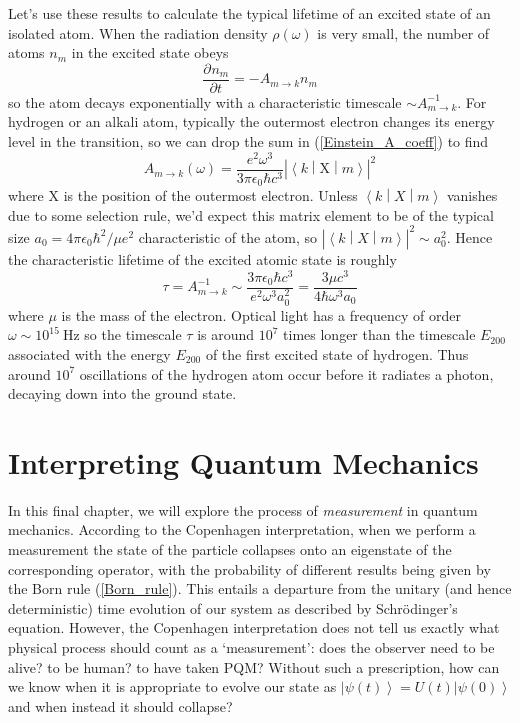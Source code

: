\documentclass{article}
\theoremstyle{plain}\theoremheaderfont{\normalfont\itshape}\theorembodyfont{\rmfamily}\theoremseparator{.}\newtheorem*{rem}{Remark}\newtheorem*{ex}{Example}\newtheorem*{proof}{Proof}\newtheorem*{altp}{Alternative proof}
\theoremstyle{plain}\theoremheaderfont{\normalfont\bfseries}\theorembodyfont{\rmfamily}\theoremseparator{.}\newtheorem{thm}{Theorem}[section]\newtheorem{lem}[thm]{Lemma}\newtheorem{prop}[thm]{Proposition}\newtheorem*{cor}{Corollary}\newtheorem{defn}[thm]{Definition}\newtheorem{clm}[thm]{Claim}\newtheorem{clminproof}{Claim}
\theoremstyle{break}\theoremheaderfont{\normalfont\itshape}\theorembodyfont{\rmfamily}\theoremseparator{.\medskip}\newtheorem*{proofskip}{Proof}\newtheorem*{exs}{Examples}\newtheorem*{rems}{Remarks}
\theoremstyle{break}\theoremheaderfont{\normalfont\bfseries}\theorembodyfont{\rmfamily}\theoremseparator{.\medskip}\newtheorem{lemskip}[thm]{Lemma}\newtheorem{defnskip}[thm]{Definition}\newtheorem{propskip}[thm]{Proposition}\newtheorem{thmskip}[thm]{Theorem}
\numberwithin{equation}{section}
\newcommand{\unit}[1]{\ \mathrm{#1}}
\newcommand{\pdv}[3][]{\frac{\partial^{#1} #2}{{\partial #3}^{#1}}}
\newcommand{\ket}[1]{\left| #1 \right\rangle}
\newcommand{\mel}[3]{\left\langle #1 \middle| #2 \middle| #3 \right\rangle}
\newcommand{\vb}[1]{\bm{\mathrm{#1}}}
\newcommand{\abs}[1]{\left| #1 \right|}
\begin{document}
    Let's use these results to calculate the typical lifetime of an excited state of an isolated atom. When the radiation density \(\rho(\omega)\) is very small, the number of atoms \(n_m\) in the excited state obeys
    \begin{equation}
        \pdv{n_m}{t}=-A_{m\to k}n_m
    \end{equation}
    so the atom decays exponentially with a characteristic timescale \(\sim A_{m\to k}^{-1}\). For hydrogen or an alkali atom, typically the outermost electron changes its energy level in the transition, so we can drop the sum in (\ref{Einstein_A_coeff}) to find
    \begin{equation}
        A_{m\to k}(\omega)=\frac{e^2\omega^3}{3\pi\epsilon_0\hbar c^3}\abs{\mel{k}{\vb{X}}{m}}^2
    \end{equation}
    where \(\vb{X}\) is the position of the outermost electron. Unless \(\mel{k}{X}{m}\) vanishes due to some selection rule, we'd expect this matrix element to be of the typical size \(a_0=4\pi\epsilon_0\hbar^2/\mu e^2\) characteristic of the atom, so \(\abs{\mel{k}{X}{m}}^2\sim a_0^2\). Hence the characteristic lifetime of the
    excited atomic state is roughly
    \begin{equation}
        \tau=A_{m\to k}^{-1}\sim\frac{3\pi\epsilon_0\hbar c^3}{e^2\omega^3 a_0^2}=\frac{3\mu c^3}{4\hbar\omega^3 a_0}
    \end{equation}
    where \(\mu\) is the mass of the electron. Optical light has a frequency of order \(\omega\sim 10^{15}\unit{Hz}\) so the timescale \(\tau\) is around \(10^7\) times longer than the timescale \(E_{200}\) associated with the energy \(E_{200}\) of the first excited state of hydrogen. Thus around \(10^7\) oscillations of the hydrogen atom occur before it radiates a photon, decaying down into the ground state.

    \newpage
    \section{Interpreting Quantum Mechanics}\label{Chap:Interpreting_QM}
    In this final chapter, we will explore the process of \textit{measurement} in quantum mechanics. According to the Copenhagen interpretation, when we perform a measurement the state of the particle collapses onto an eigenstate of the corresponding operator, with the probability of different results being given by the Born rule (\ref{Born_rule}). This entails a departure from the unitary (and hence deterministic) time evolution of our system as described by Schr\"{o}dinger's equation. However, the Copenhagen interpretation does not tell us exactly what physical process should count as a `measurement': does the observer need to be alive? to be human? to have taken PQM? Without such a prescription, how can we know when it is appropriate to evolve our state as \(\ket{\psi(t)} = U(t) \ket{\psi(0)}\) and when instead it should collapse?
\end{document}
